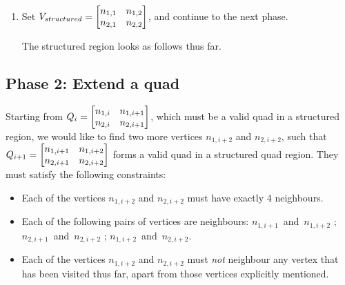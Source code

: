\begin{enumerate}
\item Set $V_{structured} = \begin{bmatrix} n_{1,1} & n_{1,2} \\ n_{2,1} & n_{2,2} \end{bmatrix}$, and continue to the next phase.

The structured region looks as follows thus far.

\end{enumerate}









\subsection{Phase 2: Extend a quad}
Starting from $Q_i = \begin{bmatrix} n_{1,i} & n_{1,i+1} \\ n_{2,i} & n_{2,i+1} \end{bmatrix}$, which must be a valid quad in a structured region, we would like to find two more vertices $n_{1, i+2}$ and $n_{2,i+2}$, such that $Q_{i+1} = \begin{bmatrix} n_{1,i+1} & n_{1,i+2} \\ n_{2,i+1} & n_{2,i+2} \end{bmatrix}$ forms a valid quad in a structured quad region. They must satisfy the following constraints:

\begin{itemize}
\item Each of the vertices $n_{1, i+2}$ and $n_{2,i+2}$ must have exactly 4 neighbours.
\item Each of the following pairs of vertices are neighbours: $n_{1,i+1}$~and~$n_{1,i+2}$ ; $n_{2,i+1}$~and~$n_{2,i+2}$ ; $n_{1,i+2}$~and~$n_{2,i+2}$.
\item Each of the vertices $n_{1, i+2}$ and $n_{2,i+2}$ must \emph{not} neighbour any vertex that has been visited thus far, apart from those vertices explicitly mentioned.
\end{itemize}

